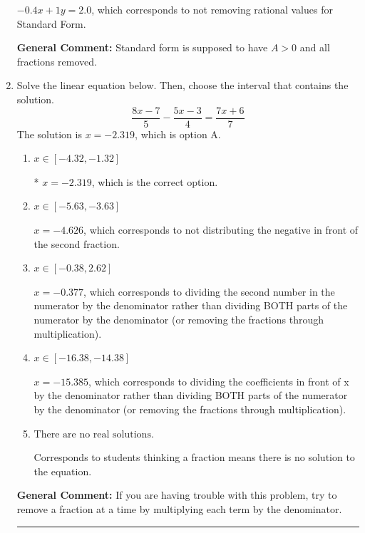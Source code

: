 \documentclass{extbook}[14pt]
\newcommand{\litem}[1]{\item #1

\rule{\textwidth}{0.4pt}}
\begin{document}
\begin{enumerate}
{\begin{enumerate}[label=\Alph*.]
 $-0.4x + 1y = 2.0$, which corresponds to not removing rational values for Standard Form.
\end{enumerate}

\textbf{General Comment:} Standard form is supposed to have $A > 0$ and all fractions removed.
}
\litem{
Solve the linear equation below. Then, choose the interval that contains the solution.
\[ \frac{8x -7}{5} - \frac{5x -3}{4} = \frac{7x + 6}{7} \]The solution is \( x = -2.319 \), which is option A.\begin{enumerate}[label=\Alph*.]
\item \( x \in [-4.32, -1.32] \)

* $x = -2.319$, which is the correct option.
\item \( x \in [-5.63, -3.63] \)

 $x = -4.626$, which corresponds to not distributing the negative in front of the second fraction.
\item \( x \in [-0.38, 2.62] \)

 $x = -0.377$, which corresponds to dividing the second number in the numerator by the denominator rather than dividing BOTH parts of the numerator by the denominator (or removing the fractions through multiplication).
\item \( x \in [-16.38, -14.38] \)

 $x = -15.385$, which corresponds to dividing the coefficients in front of x by the denominator rather than dividing BOTH parts of the numerator by the denominator (or removing the fractions through multiplication).
\item \( \text{There are no real solutions.} \)

Corresponds to students thinking a fraction means there is no solution to the equation.
\end{enumerate}

\textbf{General Comment:} If you are having trouble with this problem, try to remove a fraction at a time by multiplying each term by the denominator.
}
\end{enumerate}
\end{document}
